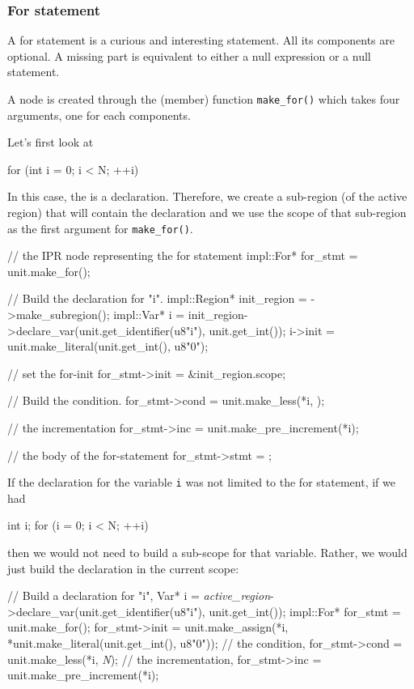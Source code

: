 \documentclass[11pt]{article}
\begin{document}
\subsubsection{For statement}
A for statement is a curious and interesting statement.  All its
components are optional.  A missing part is equivalent to either a null
expression or a null statement.

A  node is created through the (member) function
\texttt{make\_for()} which takes four arguments, one for each components.

Let's first look at 
\begin{Program}
  for (int i = 0; i < N; ++i)
\end{Program}
In this case, the  is a declaration.  Therefore,
we create a sub-region (of the active region) that will contain the declaration
and we use the scope of that sub-region as the first argument for
\texttt{make\_for()}. 
\begin{Program}
  // the IPR node representing the for statement 
  impl::For* for_stmt = unit.make_for();

  // Build the declaration for "i".
  impl::Region* init_region = ->make_subregion();
  impl::Var* i = init_region->declare_var(unit.get_identifier(u8"i"),
                                          unit.get_int());
  i->init = unit.make_literal(unit.get_int(), u8"0");

  // set the for-init
  for_stmt->init = &init_region.scope;

  // Build the condition.
  for_stmt->cond = unit.make_less(*i, );

  // the incrementation
  for_stmt->inc = unit.make_pre_increment(*i);
  
  // the body of the for-statement
  for_stmt->stmt = ;
\end{Program}

If the declaration for the variable \texttt{i} was not limited to the
for statement, \ie{} if we had
\begin{Program}
  int i;
  for (i = 0; i < N; ++i)
\end{Program}
then we would not need to build a sub-scope for that variable.  Rather, we
would just build the declaration in the current scope:
\begin{Program}
// Build a declaration for "i",
Var* i = \textit{active_region}->declare_var(unit.get_identifier(u8"i"), unit.get_int());
impl::For* for_stmt = unit.make_for();
for_stmt->init = unit.make_assign(*i, *unit.make_literal(unit.get_int(), u8"0"));
// the condition,
for_stmt->cond = unit.make_less(*i, \textit{N});
// the incrementation,
for_stmt->inc = unit.make_pre_increment(*i);
\end{Program}
\end{document}
